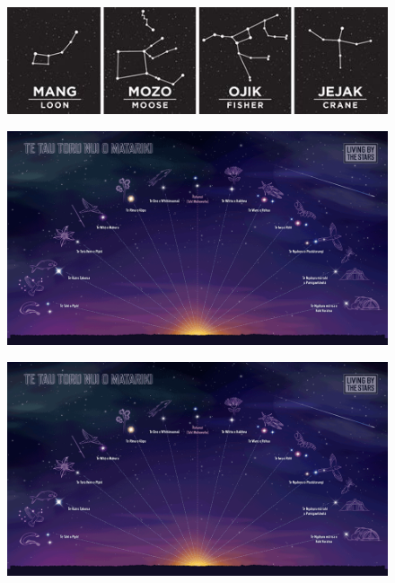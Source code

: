 \documentclass{beamer}
\begin{document}
\begin{frame}
\begin{figure}
    \centering
    \includegraphics[width=0.95\linewidth]{cs12-astronomy-indigenous-constellations.png}
\end{figure}
\end{frame}
\begin{frame}{
}
    
\begin{figure}
    \centering
    \includegraphics[width=0.95\linewidth]{cs12-place-maori_astronomy.png}
\end{figure}
\end{frame}
\begin{frame}
\begin{figure}
    \centering
    \includegraphics[width=0.95\linewidth]{../images/cs12-place-maori_astronomy.png}
\end{figure}
\end{frame}
\end{document}
